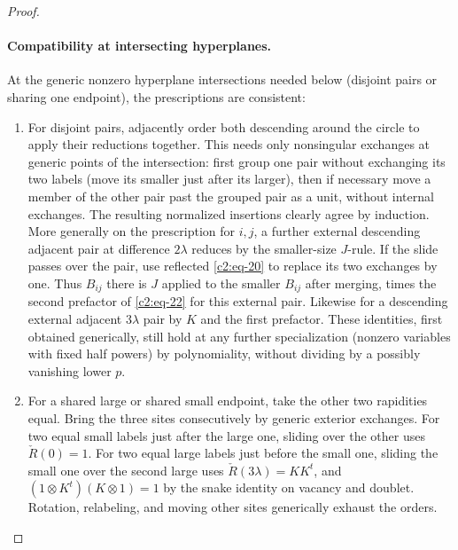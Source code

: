 \begin{proof}
\paragraph{Compatibility at intersecting hyperplanes.}
At the generic nonzero hyperplane intersections needed below (disjoint pairs or sharing one endpoint), the prescriptions are consistent:
\begin{enumerate}
\item For disjoint pairs, adjacently order both descending around the circle to apply their reductions together. This needs only nonsingular exchanges at generic points of the intersection: first group one pair without exchanging its two labels (move its smaller just after its larger), then if necessary move a member of the other pair past the grouped pair as a unit, without internal exchanges. The resulting normalized insertions clearly agree by induction. More generally on the prescription for \(i,j\), a further external descending adjacent pair at difference \(2\lambda\) reduces by the smaller-size \(J\)-rule. If the slide passes over the pair, use reflected \eqref{c2:eq-20} to replace its two exchanges by one. Thus \(B_{ij}\) there is \(J\) applied to the smaller \(B_{ij}\) after merging, times the second prefactor of \eqref{c2:eq-22} for this external pair. Likewise for a descending external adjacent \(3\lambda\) pair by \(K\) and the first prefactor. These identities, first obtained generically, still hold at any further specialization (nonzero variables with fixed half powers) by polynomiality, without dividing by a possibly vanishing lower \(p\).
\item For a shared large or shared small endpoint, take the other two rapidities equal. Bring the three sites consecutively by generic exterior exchanges. For two equal small labels just after the large one, sliding over the other uses \(\check R(0)=1\). For two equal large labels just before the small one, sliding the small one over the second large uses \(\check R(3\lambda)=KK^t\), and \((1\otimes K^t)(K\otimes1)=1\) by the snake identity on vacancy and doublet. Rotation, relabeling, and moving other sites generically exhaust the orders.

\end{enumerate}
\end{proof}
